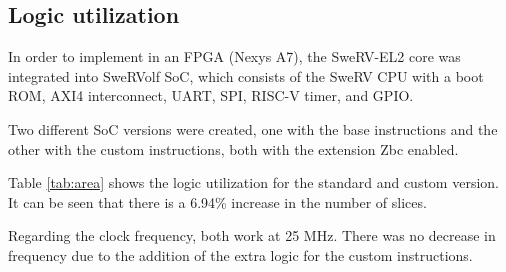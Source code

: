 \subsection{Logic utilization} 

In order to implement in an FPGA (Nexys A7), the SweRV-EL2 core was integrated into SweRVolf \cite{swervolf} SoC, 
which consists of the SweRV CPU with a boot ROM, AXI4 interconnect, UART, SPI, \mbox{RISC-V} timer, and GPIO. %

Two different SoC versions were created, one with the base instructions and the other with the custom instructions, 
both with the extension Zbc \cite{swervel2} enabled.

Table \ref{tab:area} shows the logic utilization for the standard and custom version. It can be seen that there is a 6.94\% increase in the 
number of slices.

Regarding the clock frequency, both work at 25 MHz. There was no decrease in frequency due to the addition of the extra logic for the
custom instructions.


